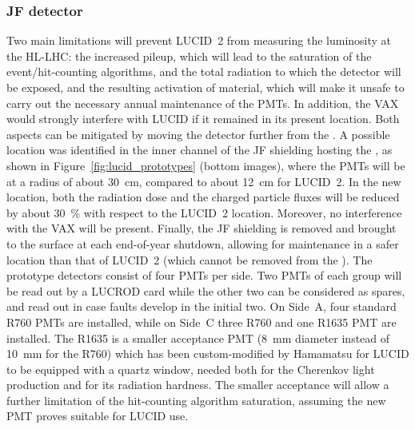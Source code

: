 \documentclass[cernpreprint, atlasdraft=false, UKenglish,british,orcidlogo, texmf, orcidlogo]{atlasdoc}
\begin{document}
\subsubsection{JF detector}
Two main limitations will prevent \gls{LUCID}~2 from measuring the luminosity at the \gls{HL-LHC}: the increased pileup, which will lead to the saturation of the event/hit-counting algorithms, and the total radiation to which the detector will be exposed, and the resulting activation of material, which will make it unsafe to carry out the necessary annual maintenance of the \glspl{PMT}. In addition, the \gls{VAX} would strongly interfere with \gls{LUCID} if it remained in its present location. Both aspects can be mitigated by moving the detector further from the \beampipe. A possible location was identified in the inner channel of the JF shielding
hosting the \beampipe, as shown in Figure~\ref{fig:lucid_prototypes} (bottom images), where the \glspl{PMT} will be at a radius of about \SI{30}{\cm}, compared to about \SI{12}{\cm} for \gls{LUCID}~2. In the new location, both the radiation dose and the charged particle fluxes will be reduced by about \SI{30}{\percent} with respect to the \gls{LUCID}~2 location. Moreover, no interference with the \gls{VAX} will be present. Finally,
the JF shielding is removed and brought to the surface at each end-of-year shutdown, allowing for maintenance in a safer location than that of
\gls{LUCID}~2 (which cannot be removed from the \beampipe).
The prototype detectors consist of four \glspl{PMT} per side. Two \glspl{PMT} of each group will be read out by a \gls{LUCROD} card while the other two can be considered as spares, and read out in case faults develop in the initial two.
On Side~A, four standard R760 \glspl{PMT}
are installed, while on Side~C three R760 and one R1635 \gls{PMT} are installed.
The R1635 is a smaller acceptance \gls{PMT} (\SI{8}{\mm} diameter instead of \SI{10}{\mm} for
the R760) which has been custom-modified by Hamamatsu for \gls{LUCID}
to be equipped with a quartz window, needed both for the Cherenkov light production and for its radiation hardness.
The smaller acceptance will allow a further limitation of the hit-counting algorithm saturation, assuming the new \gls{PMT} proves suitable for \gls{LUCID} use.
\end{document}
